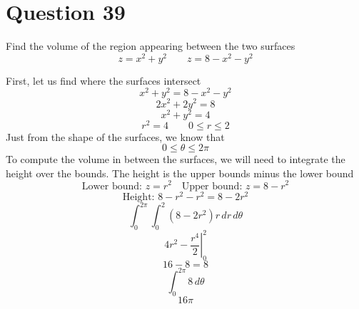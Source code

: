 \documentclass[hidelinks]{article}
\begin{document}
\section{Question 39}
Find the volume of the region appearing between the two surfaces
\[
    z = x^2+y^2 \quad \quad z = 8 - x^2-y^2
\]
\vspace{0.2cm}

First, let us find where the surfaces intersect
\[
    x^2+y^2 = 8 - x^2-y^2
\]
\[
    2x^2+2y^2 = 8
\]
\[
    x^2+y^2 = 4
\]
\[
    r^2 = 4 \quad \quad 0 \leq r \leq 2
\]
Just from the shape of the surfaces, we know that
\[
    0 \leq \theta \leq 2\pi
\]
To compute the volume in between the surfaces, we will need to integrate the height over the bounds. The height is the upper bounds minus the lower bound
\[
    \text{Lower bound: } z = r^2 \quad \text{Upper bound: } z = 8-r^2
\]
\[
    \text{Height: } 8-r^2 - r^2 = 8-2r^2
\]
\[
    \int_0^{2\pi} \int_0^2 (8-2r^2) r \, dr \, d\theta
\]
\[
   \left . 4r^2 - \frac{r^4}{2} \right |_0^2
\]
\[
    16 - 8 = 8 
\]
\[
    \int_0^{2\pi} 8 \, d\theta
\]
\[
16 \pi
\]
\end{document}
